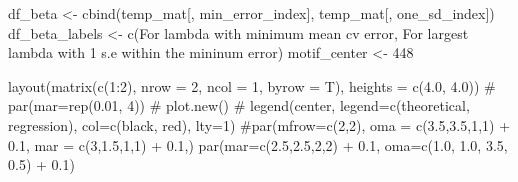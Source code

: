 \documentclass[
  letterpaper,
  DIV=11,
  numbers=noendperiod]{scrartcl}
\newenvironment{Shaded}{\begin{snugshade}}{\end{snugshade}}
\newcommand{\AttributeTok}[1]{\textcolor[rgb]{0.40,0.45,0.13}{#1}}
\newcommand{\CommentTok}[1]{\textcolor[rgb]{0.37,0.37,0.37}{#1}}
\newcommand{\DecValTok}[1]{\textcolor[rgb]{0.68,0.00,0.00}{#1}}
\newcommand{\FloatTok}[1]{\textcolor[rgb]{0.68,0.00,0.00}{#1}}
\newcommand{\FunctionTok}[1]{\textcolor[rgb]{0.28,0.35,0.67}{#1}}
\newcommand{\NormalTok}[1]{\textcolor[rgb]{0.00,0.23,0.31}{#1}}
\newcommand{\OtherTok}[1]{\textcolor[rgb]{0.00,0.23,0.31}{#1}}
\newcommand{\SpecialCharTok}[1]{\textcolor[rgb]{0.37,0.37,0.37}{#1}}
\newcommand{\StringTok}[1]{\textcolor[rgb]{0.13,0.47,0.30}{#1}}
\begin{document}
\begin{Shaded}
\begin{Highlighting}[]
\NormalTok{df\_beta }\OtherTok{\textless{}{-}} \FunctionTok{cbind}\NormalTok{(temp\_mat[, min\_error\_index], temp\_mat[, one\_sd\_index])}
\NormalTok{df\_beta\_labels }\OtherTok{\textless{}{-}} \FunctionTok{c}\NormalTok{(}\StringTok{\textquotesingle{}For lambda with minimum mean cv error\textquotesingle{}}\NormalTok{, }\StringTok{\textquotesingle{}For largest lambda with 1 s.e within the mininum error\textquotesingle{}}\NormalTok{)}
\NormalTok{motif\_center }\OtherTok{\textless{}{-}} \DecValTok{448}
\end{Highlighting}
\end{Shaded}

\begin{Shaded}
\begin{Highlighting}[]
\FunctionTok{layout}\NormalTok{(}\FunctionTok{matrix}\NormalTok{(}\FunctionTok{c}\NormalTok{(}\DecValTok{1}\SpecialCharTok{:}\DecValTok{2}\NormalTok{), }\AttributeTok{nrow =} \DecValTok{2}\NormalTok{, }\AttributeTok{ncol =} \DecValTok{1}\NormalTok{, }\AttributeTok{byrow =}\NormalTok{ T), }\AttributeTok{heights =} \FunctionTok{c}\NormalTok{(}\FloatTok{4.0}\NormalTok{, }\FloatTok{4.0}\NormalTok{))}
\CommentTok{\# par(mar=rep(0.01, 4))}
\CommentTok{\# plot.new()}
\CommentTok{\# legend(\textquotesingle{}center\textquotesingle{}, legend=c(\textquotesingle{}theoretical\textquotesingle{}, \textquotesingle{}regression\textquotesingle{}), col=c(\textquotesingle{}black\textquotesingle{}, \textquotesingle{}red\textquotesingle{}), lty=1)}
\CommentTok{\#par(mfrow=c(2,2), oma = c(3.5,3.5,1,1) + 0.1, mar = c(3,1.5,1,1) + 0.1,)}
\FunctionTok{par}\NormalTok{(}\AttributeTok{mar=}\FunctionTok{c}\NormalTok{(}\FloatTok{2.5}\NormalTok{,}\FloatTok{2.5}\NormalTok{,}\DecValTok{2}\NormalTok{,}\DecValTok{2}\NormalTok{) }\SpecialCharTok{+} \FloatTok{0.1}\NormalTok{, }\AttributeTok{oma=}\FunctionTok{c}\NormalTok{(}\FloatTok{1.0}\NormalTok{, }\FloatTok{1.0}\NormalTok{, }\FloatTok{3.5}\NormalTok{, }\FloatTok{0.5}\NormalTok{) }\SpecialCharTok{+} \FloatTok{0.1}\NormalTok{)}


\end{Highlighting}
\end{Shaded}
\end{document}
